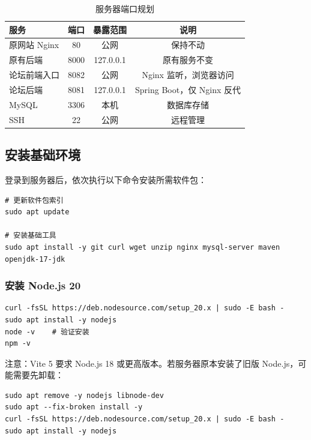 \documentclass[bwprint]{report}
\begin{document}
\begin{table}[H]
    \caption{服务器端口规划}
    \label{tab:port-plan}
    \centering
    \begin{tabular}{lccc}
        \toprule[1.5pt]
        服务 & 端口 & 暴露范围 & 说明 \\
        \midrule[1pt]
        原网站 Nginx & 80 & 公网 & 保持不动 \\
        原有后端 & 8000 & 127.0.0.1 & 原有服务不变 \\
        论坛前端入口 & 8082 & 公网 & Nginx 监听，浏览器访问 \\
        论坛后端 & 8081 & 127.0.0.1 & Spring Boot，仅 Nginx 反代 \\
        MySQL & 3306 & 本机 & 数据库存储 \\
        SSH & 22 & 公网 & 远程管理 \\
        \bottomrule[1.5pt]
    \end{tabular}
\end{table}

 
\subsection{安装基础环境}

登录到服务器后，依次执行以下命令安装所需软件包：

\begin{lstlisting}
# 更新软件包索引
sudo apt update

# 安装基础工具
sudo apt install -y git curl wget unzip nginx mysql-server maven openjdk-17-jdk
\end{lstlisting}

\subsubsection{安装 Node.js 20}

\begin{lstlisting}
curl -fsSL https://deb.nodesource.com/setup_20.x | sudo -E bash -
sudo apt install -y nodejs
node -v    # 验证安装
npm -v
\end{lstlisting}

注意：Vite 5 要求 Node.js 18 或更高版本。若服务器原本安装了旧版 Node.js，可能需要先卸载：

\begin{lstlisting}
sudo apt remove -y nodejs libnode-dev
sudo apt --fix-broken install -y
curl -fsSL https://deb.nodesource.com/setup_20.x | sudo -E bash -
sudo apt install -y nodejs
\end{lstlisting}
\end{document}
